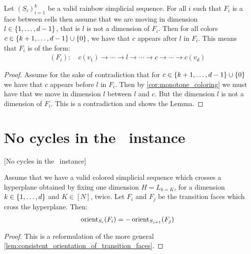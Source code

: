 \begin{lemma}
	\label{lem:ordering_of_vertices_in_transition_faces}
	Let $\left(S_i\right)_{i=1}^k$ be a valid rainbow simplicial sequence. For all $i$ such that $F_i$ is a face between cells then assume that we are moving in dimension $l \in \left\{1, \dots, d-1\right\}$, that is $l$ is not a dimension of $F_i$. Then for all colors $c \in \left\{k+1, \dots, d-1\right\} \cup \left\{0\right\}$, we have that $c$ appears after $l$ in $F_i$. This means that $F_i$ is of the form:
	\begin{align*}
		(F_i): \quad c(v_1) \xrightarrow{} \cdots \xrightarrow{} l \xrightarrow{} \cdots \xrightarrow{} c \xrightarrow{} \cdots \xrightarrow{} c(v_d)
	\end{align*}
\end{lemma}
\begin{proof}
	Assume for the sake of contradiction that for $c \in \left\{k+1, \dots, d-1\right\} \cup \left\{0\right\}$ we have that $c$ appears before $l$ in $F_i$. Then by \cref{cor:monotone_coloring} we must have that we move in dimension $l$ between $l$ and $c$. But the dimension $l$ is not a dimension of $F_i$. This is a contradiction and shows the Lemma.
\end{proof}

\section{No cycles in the \EndOfLine\ instance}[No cycles in the \EndOfLine\ instance]

\begin{remark}
	Assume that we have a valid colored simplicial sequence which crosses a hyperplane obtained by fixing one dimension $H = L_{k = K}$, for a dimension $k \in \left\{1, \dots, d\right\}$ and $K \in [N]$, twice. Let $F_i$ and $F_j$ be the transition faces which cross the hyperplane. Then: 
	\begin{align*}
		\operatorname{orient}_{S_i}(F_i) = - \operatorname{orient}_{S_{j+1}}(F_j)
	\end{align*}
\end{remark}
\begin{proof}
	This is a reformulation of the more general \cref{lem:consistent_orientation_of_transition_faces}.
\end{proof}

